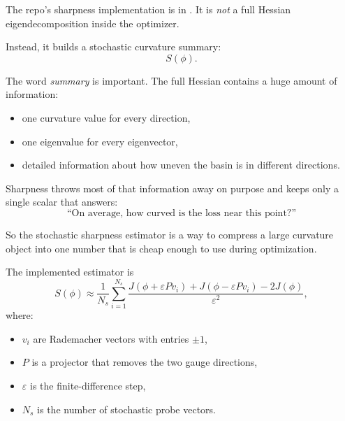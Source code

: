 \documentclass[11pt,letterpaper]{article}
\begin{document}
The repo's sharpness implementation is in
. It is \emph{not} a full
Hessian eigendecomposition inside the optimizer.

Instead, it builds a stochastic curvature summary:
\[
S(\phi).
\]

The word \emph{summary} is important. The full Hessian contains a huge amount of
information:
\begin{itemize}[leftmargin=*]
  \item one curvature value for every direction,
  \item one eigenvalue for every eigenvector,
  \item detailed information about how uneven the basin is in different
  directions.
\end{itemize}

Sharpness throws most of that information away on purpose and keeps only a
single scalar that answers:
\[
\text{``On average, how curved is the loss near this point?''}
\]

So the stochastic sharpness estimator is a way to compress a large curvature
object into one number that is cheap enough to use during optimization.

The implemented estimator is
\[
S(\phi)
\approx
\frac{1}{N_s}
\sum_{i=1}^{N_s}
\frac{
J(\phi + \varepsilon P v_i)
+
J(\phi - \varepsilon P v_i)
-
2J(\phi)
}{\varepsilon^2},
\]
where:
\begin{itemize}[leftmargin=*]
  \item $v_i$ are Rademacher vectors with entries $\pm 1$,
  \item $P$ is a projector that removes the two gauge directions,
  \item $\varepsilon$ is the finite-difference step,
  \item $N_s$ is the number of stochastic probe vectors.
\end{itemize}
\end{document}
